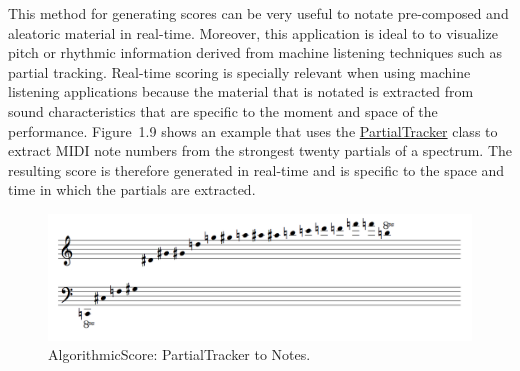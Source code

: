 This method for generating scores can be very useful to notate pre-composed and aleatoric material in real-time. Moreover, this application is ideal to to visualize pitch or rhythmic information derived from machine listening techniques such as partial tracking. Real-time scoring is specially relevant when using machine listening applications because the material that is notated is extracted from sound characteristics that are specific to the moment and space of the performance. \mbox{Figure 1.9} shows an example that uses the \hyperlink{partrack}{PartialTracker} class to extract MIDI note numbers from the strongest twenty partials of a spectrum. The resulting score is therefore generated in real-time and is specific to the space and time in which the partials are extracted.
\begin{figure}[htbp] %
   \centering
   \includegraphics[width=17cm]{Chapter4/algoScore_partials.tif} %
   \caption{AlgorithmicScore: PartialTracker to Notes.}
   \label{fig:example}
\end{figure}\

